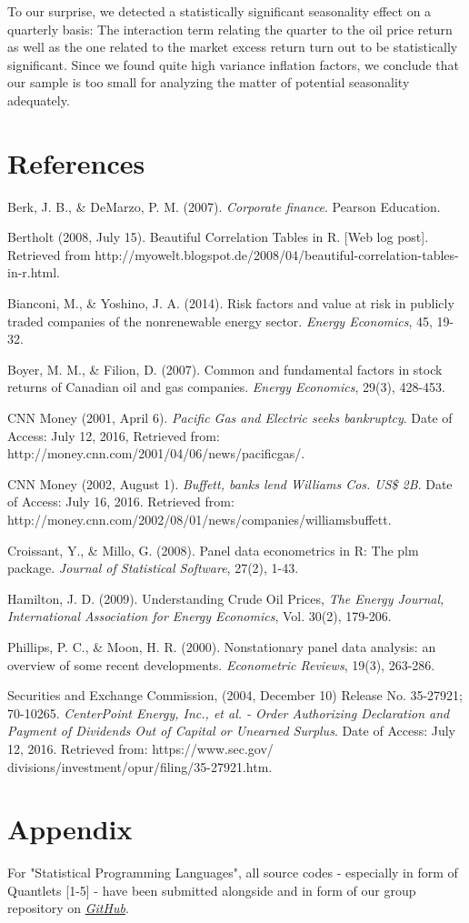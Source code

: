 \documentclass[a4paper]{article}
\begin{document}
To our surprise, we detected a statistically significant seasonality effect on a quarterly basis: The interaction term relating the quarter to the oil price return as well as the one related to the market excess return turn out to be statistically significant. Since we found quite high variance inflation factors, we conclude that our sample is too small for analyzing the matter of potential seasonality adequately. 

\pagebreak
\section{References}

Berk, J. B., \& DeMarzo, P. M. (2007). \emph{Corporate finance}. Pearson Education.

Bertholt (2008, July 15). Beautiful Correlation Tables in R. [Web log post]. Retrieved from http://myowelt.blogspot.de/2008/04/beautiful-correlation-tables-in-r.html.

Bianconi, M., \& Yoshino, J. A. (2014). Risk factors and value at risk in publicly traded companies of the nonrenewable energy sector. \emph{Energy Economics}, 45, 19-32.

Boyer, M. M., \& Filion, D. (2007). Common and fundamental factors in stock returns of Canadian oil and gas companies. \emph{Energy Economics}, 29(3), 428-453.

CNN Money (2001, April 6). \emph{Pacific Gas and Electric seeks bankruptcy}. Date of Access: July 12, 2016, Retrieved from: http://money.cnn.com/2001/04/06/news/pacificgas/.

CNN Money (2002, August 1). \emph{Buffett, banks lend Williams Cos. US\$ 2B}. Date of Access: July 16, 2016. Retrieved from: http://money.cnn.com/2002/08/01/news/companies/williamsbuffett.

Croissant, Y., \& Millo, G. (2008). Panel data econometrics in R: The plm package. \emph{Journal of Statistical Software}, 27(2), 1-43.

Hamilton, J. D. (2009). Understanding Crude Oil Prices, \emph{The Energy Journal, International Association for Energy Economics}, Vol. 30(2), 179-206.

Phillips, P. C., \& Moon, H. R. (2000). Nonstationary panel data analysis: an overview of some recent developments. \emph{Econometric Reviews}, 19(3), 263-286.

Securities and Exchange Commission, (2004, December 10) Release No. 35-27921; 70-10265. \emph{CenterPoint Energy, Inc., et al. - Order Authorizing Declaration and Payment of Dividends Out of Capital or Unearned Surplus}. Date of Access: July 12, 2016. Retrieved from: https://www.sec.gov/ divisions/investment/opur/filing/35-27921.htm.


\section{Appendix}

For "Statistical Programming Languages", all source codes - especially in form of Quantlets [1-5] - have been submitted alongside and in form of our group repository on \href{https://github.com/Fabian-HC/SPL-OilUS}{\emph{GitHub}}.
\end{document}
